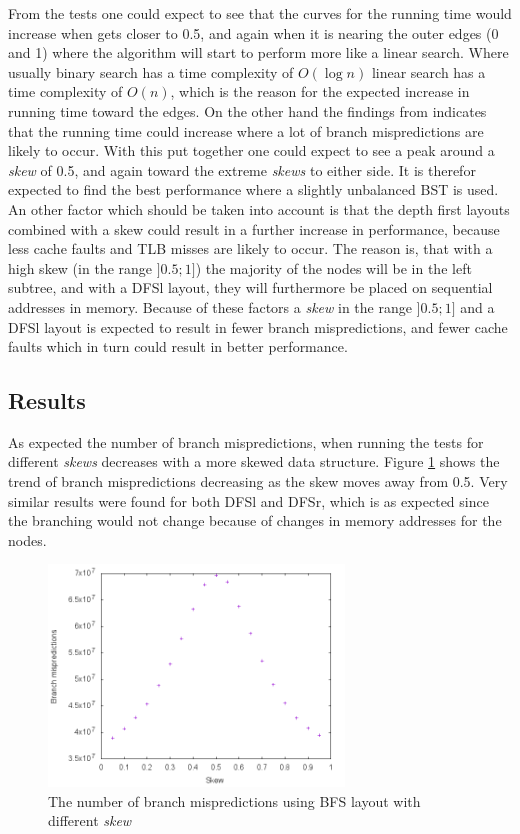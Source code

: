 \documentclass{article}
\begin{document}
From the tests one could expect to see that the curves for the running time would increase when gets closer to 0.5, and again when it is nearing the outer edges (0 and 1) where the algorithm will start to perform more like a linear search. Where usually binary search has a time complexity of $O(\log n)$ linear search has a time complexity of $O(n)$, which is the reason for the expected increase in running time toward the edges. On the other hand the findings from \citet{brodal-bst} indicates that the running time could increase where a lot of branch mispredictions are likely to occur. With this put together one could expect to see a peak around a \textit{skew} of 0.5, and again toward the extreme \textit{skews} to either side. It is therefor expected to find the best performance where a slightly unbalanced BST is used. An other factor which should be taken into account is that the depth first layouts combined with a skew could result in a further increase in performance, because less cache faults and TLB misses are likely to occur. The reason is, that with a high skew (in the range $]0.5;1]$) the majority of the nodes will be in the left subtree, and with a DFSl layout, they will furthermore be placed on sequential addresses in memory. Because of these factors a \textit{skew} in the range $]0.5;1]$ and a DFSl layout is expected to result in fewer branch mispredictions, and fewer cache faults which in turn could result in better performance.

\subsection{Results}
As expected the number of branch mispredictions, when running the tests for different \textit{skews} decreases with a more skewed data structure. Figure \ref{fig:branch_misses} shows the trend of branch mispredictions decreasing as the skew moves away from 0.5. Very similar results were found for both DFSl and DFSr, which is as expected since the branching would not change because of changes in memory addresses for the nodes.

\begin{figure}[H]
	\centering
	\includegraphics[width=0.7\textwidth]{figures/BFS_branch_misses}
	\caption{The number of branch mispredictions using BFS layout with different \textit{skew}}
	\label{fig:branch_misses}
\end{figure}
\end{document}
